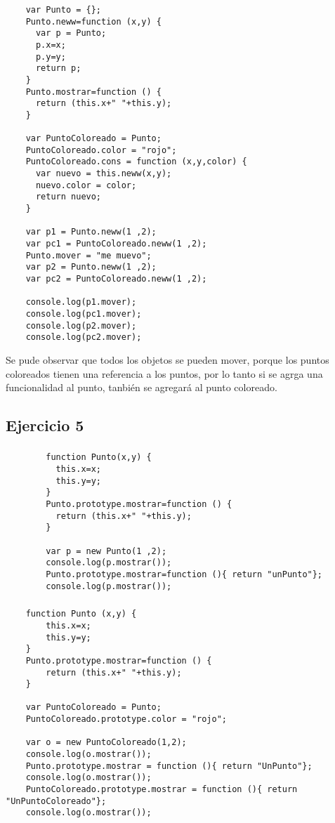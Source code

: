 \documentclass[10pt,a4paper]{article}
\begin{document}
\subsubsection{}
    \begin{lstlisting}
    var Punto = {};
    Punto.neww=function (x,y) {
      var p = Punto;
      p.x=x;
      p.y=y;
      return p;
    }
    Punto.mostrar=function () {
      return (this.x+" "+this.y);
    }

    var PuntoColoreado = Punto;
    PuntoColoreado.color = "rojo";
    PuntoColoreado.cons = function (x,y,color) {
      var nuevo = this.neww(x,y);
      nuevo.color = color;
      return nuevo;
    }

    var p1 = Punto.neww(1 ,2);
    var pc1 = PuntoColoreado.neww(1 ,2);
    Punto.mover = "me muevo";
    var p2 = Punto.neww(1 ,2);
    var pc2 = PuntoColoreado.neww(1 ,2);

    console.log(p1.mover);
    console.log(pc1.mover);
    console.log(p2.mover);
    console.log(pc2.mover);
    \end{lstlisting}
    Se pude observar que todos los objetos se pueden mover, porque los puntos coloreados tienen una referencia a los puntos, por lo tanto si se agrga una funcionalidad al punto, tanbién se agregará al punto coloreado.
    
\subsection{Ejercicio 5}
\subsubsection{}
    \begin{lstlisting}
        function Punto(x,y) {
          this.x=x;
          this.y=y;
        }
        Punto.prototype.mostrar=function () {
          return (this.x+" "+this.y);
        }

        var p = new Punto(1 ,2);
        console.log(p.mostrar());
        Punto.prototype.mostrar=function (){ return "unPunto"};
        console.log(p.mostrar());
    \end{lstlisting}    
\subsubsection{}
    \begin{lstlisting}
    function Punto (x,y) {
    	this.x=x;
    	this.y=y;
    }
    Punto.prototype.mostrar=function () {
    	return (this.x+" "+this.y);
    }
    
    var PuntoColoreado = Punto;
    PuntoColoreado.prototype.color = "rojo";

    var o = new PuntoColoreado(1,2);
    console.log(o.mostrar());
    Punto.prototype.mostrar = function (){ return "UnPunto"};
    console.log(o.mostrar());
    PuntoColoreado.prototype.mostrar = function (){ return "UnPuntoColoreado"};
    console.log(o.mostrar());
    \end{lstlisting}
\end{document}

